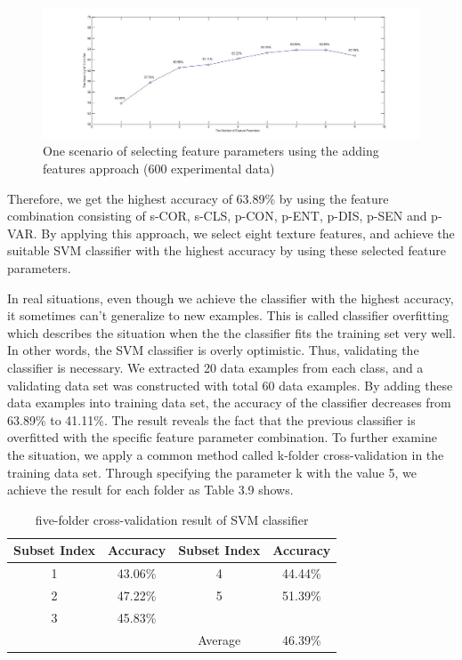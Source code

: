 \begin{figure}[!h]
\includegraphics[width=\linewidth]{fig3_6}
\caption{One scenario of selecting feature parameters using the adding features approach (600 experimental data)}
\end{figure}
Therefore, we get the highest accuracy of 63.89\% by using the feature combination consisting of s-COR, s-CLS, p-CON, p-ENT, p-DIS, p-SEN and p-VAR. By applying this approach, we select eight texture features, and achieve the suitable SVM classifier with the highest accuracy by using these selected feature parameters.\par
In real situations, even though we achieve the classifier with the highest accuracy, it sometimes can't generalize to new examples. This is called classifier overfitting which describes the situation when the the classifier fits the training set very well. In other words, the SVM classifier is overly optimistic. Thus, validating the classifier is necessary. We extracted 20 data examples from each class, and a validating data set was constructed with total 60 data examples. By adding these data examples into training data set, the accuracy of the classifier decreases from 63.89\% to 41.11\%. The result reveals the fact that the previous classifier is overfitted with the specific feature parameter combination. To further examine the situation, we apply a common method called k-folder cross-validation in the training data set. Through specifying the parameter k with the value 5, we achieve the result for each folder as Table 3.9 shows.  
\begin{table}[!h]
\begin{center}
\begin{tabular}{||c c | c c ||}
\hline
Subset Index & Accuracy & Subset Index & Accuracy \\[0.7ex]
\hline\hline
1 & 43.06\% & 4 & 44.44\% \\
2 & 47.22\% & 5 & 51.39\% \\
3 & 45.83\% &  &  \\
\hline
 & & Average & 46.39\% \\
\hline
\end{tabular}
\caption {five-folder cross-validation result of SVM classifier}
\end{center}
\end{table}
